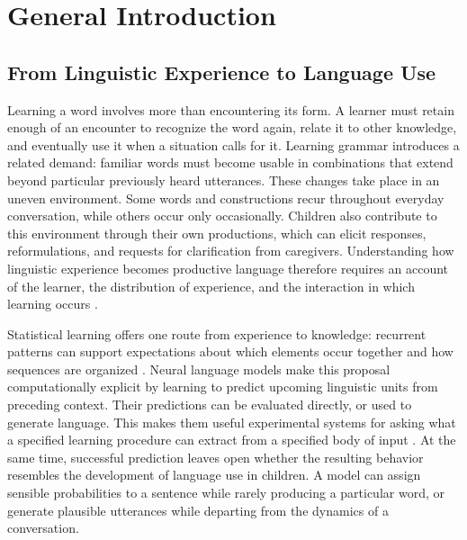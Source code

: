 \providecommand{\meCDI}{\textsc{corpus-CDI}}
\chapter{General Introduction}\label{chp1_intro}


\section{From Linguistic Experience to Language Use}
\label{sec:intro:problem}

Learning a word involves more than encountering its form. A learner must retain enough of an encounter to recognize the word again, relate it to other knowledge, and eventually use it when a situation calls for it. Learning grammar introduces a related demand: familiar words must become usable in combinations that extend beyond particular previously heard utterances. These changes take place in an uneven environment. Some words and constructions recur throughout everyday conversation, while others occur only occasionally. Children also contribute to this environment through their own productions, which can elicit responses, reformulations, and requests for clarification from caregivers. Understanding how linguistic experience becomes productive language therefore requires an account of the learner, the distribution of experience, and the interaction in which learning occurs \citep{tomasello2003constructing,ambridge2015ubiquity,clark_conversational_2020}.

Statistical learning offers one route from experience to knowledge: recurrent patterns can support expectations about which elements occur together and how sequences are organized \citep{saffran1996statistical}. Neural language models make this proposal computationally explicit by learning to predict upcoming linguistic units from preceding context. Their predictions can be evaluated directly, or used to generate language. This makes them useful experimental systems for asking what a specified learning procedure can extract from a specified body of input \citep{dupoux2018cognitive,warstadt2022what}. At the same time, successful prediction leaves open whether the resulting behavior resembles the development of language use in children. A model can assign sensible probabilities to a sentence while rarely producing a particular word, or generate plausible utterances while departing from the dynamics of a conversation.

